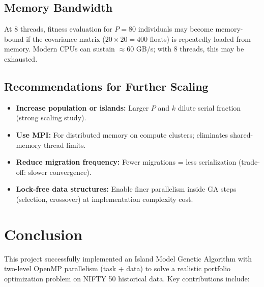 \documentclass[12pt,a4paper]{article}
\begin{document}
\subsection{Memory Bandwidth}

At 8 threads, fitness evaluation for $P = 80$ individuals may become memory-bound if the covariance matrix ($20 \times 20 = 400$ floats) is repeatedly loaded from memory. Modern CPUs can sustain $\approx 60$ GB/s; with 8 threads, this may be exhausted.

\subsection{Recommendations for Further Scaling}

\begin{itemize}
	\item \textbf{Increase population or islands:} Larger $P$ and $k$ dilute serial fraction (strong scaling study).
	
	\item \textbf{Use MPI:} For distributed memory on compute clusters; eliminates shared-memory thread limits.
	
	\item \textbf{Reduce migration frequency:} Fewer migrations = less serialization (trade-off: slower convergence).
	
	\item \textbf{Lock-free data structures:} Enable finer parallelism inside GA steps (selection, crossover) at implementation complexity cost.
\end{itemize}

\newpage
\section{Conclusion}

This project successfully implemented an Island Model Genetic Algorithm with two-level OpenMP parallelism (task + data) to solve a realistic portfolio optimization problem on NIFTY 50 historical data. Key contributions include:
\end{document}
